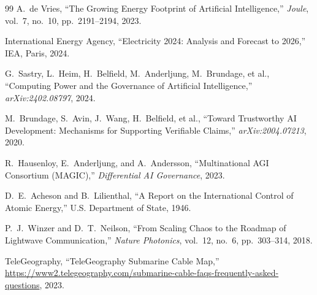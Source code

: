 \documentclass[12pt]{article}
\begin{document}
\begin{thebibliography}{99}
A.~de Vries,
\newblock ``The Growing Energy Footprint of Artificial Intelligence,''
\newblock \emph{Joule}, vol.~7, no.~10, pp.~2191--2194, 2023.

International Energy Agency,
\newblock ``Electricity 2024: Analysis and Forecast to 2026,''
\newblock IEA, Paris, 2024.

G.~Sastry, L.~Heim, H.~Belfield, M.~Anderljung, M.~Brundage, et al.,
\newblock ``Computing Power and the Governance of Artificial Intelligence,''
\newblock \emph{arXiv:2402.08797}, 2024.

M.~Brundage, S.~Avin, J.~Wang, H.~Belfield, et al.,
\newblock ``Toward Trustworthy AI Development: Mechanisms for Supporting Verifiable Claims,''
\newblock \emph{arXiv:2004.07213}, 2020.

R.~Hausenloy, E.~Anderljung, and A.~Andersson,
\newblock ``Multinational AGI Consortium (MAGIC),''
\newblock \emph{Differential AI Governance}, 2023.

D.~E.~Acheson and B.~Lilienthal,
\newblock ``A Report on the International Control of Atomic Energy,''
\newblock U.S. Department of State, 1946.

P.~J.~Winzer and D.~T.~Neilson,
\newblock ``From Scaling Chaos to the Roadmap of Lightwave Communication,''
\newblock \emph{Nature Photonics}, vol.~12, no.~6, pp.~303--314, 2018.

TeleGeography,
\newblock ``TeleGeography Submarine Cable Map,''
\newblock \url{https://www2.telegeography.com/submarine-cable-faqs-frequently-asked-questions}, 2023.

\end{thebibliography}
\end{document}
